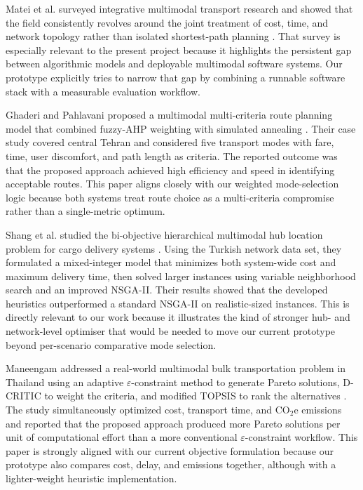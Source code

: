 Matei et al. surveyed integrative multimodal transport research and showed that the field consistently revolves around the joint treatment of cost, time, and network topology rather than isolated shortest-path planning \cite{matei2021}. That survey is especially relevant to the present project because it highlights the persistent gap between algorithmic models and deployable multimodal software systems. Our prototype explicitly tries to narrow that gap by combining a runnable software stack with a measurable evaluation workflow.

Ghaderi and Pahlavani proposed a multimodal multi-criteria route planning model that combined fuzzy-AHP weighting with simulated annealing \cite{ghaderi2015}. Their case study covered central Tehran and considered five transport modes with fare, time, user discomfort, and path length as criteria. The reported outcome was that the proposed approach achieved high efficiency and speed in identifying acceptable routes. This paper aligns closely with our weighted mode-selection logic because both systems treat route choice as a multi-criteria compromise rather than a single-metric optimum.

Shang et al. studied the bi-objective hierarchical multimodal hub location problem for cargo delivery systems \cite{shang2021}. Using the Turkish network data set, they formulated a mixed-integer model that minimizes both system-wide cost and maximum delivery time, then solved larger instances using variable neighborhood search and an improved NSGA-II. Their results showed that the developed heuristics outperformed a standard NSGA-II on realistic-sized instances. This is directly relevant to our work because it illustrates the kind of stronger hub- and network-level optimiser that would be needed to move our current prototype beyond per-scenario comparative mode selection.

Maneengam addressed a real-world multimodal bulk transportation problem in Thailand using an adaptive \(\varepsilon\)-constraint method to generate Pareto solutions, D-CRITIC to weight the criteria, and modified TOPSIS to rank the alternatives \cite{maneengam2023}. The study simultaneously optimized cost, transport time, and \(\mathrm{CO_2e}\) emissions and reported that the proposed approach produced more Pareto solutions per unit of computational effort than a more conventional \(\varepsilon\)-constraint workflow. This paper is strongly aligned with our current objective formulation because our prototype also compares cost, delay, and emissions together, although with a lighter-weight heuristic implementation.

